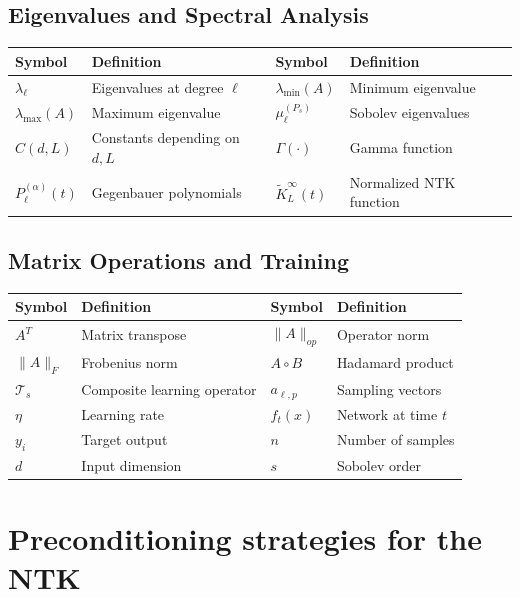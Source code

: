 \documentclass[a4paper]{article}
\theoremstyle{plain}
\theoremstyle{definition}
\theoremstyle{remark}
\begin{document}
\begin{tcolorbox}[colback=blue!5,colframe=blue!50!black,title={\large \textbf{Mathematical Notation Reference (continued)}},enhanced,drop shadow]
\subsection*{Eigenvalues and Spectral Analysis}
\begin{longtable}{p{}p{}p{}p{}}
\toprule
\textbf{Symbol} & \textbf{Definition} & \textbf{Symbol} & \textbf{Definition} \\
\midrule
$\lambda_\ell$ & Eigenvalues at degree $\ell$ & $\lambda_{\min}(A)$ & Minimum eigenvalue \\
$\lambda_{\max}(A)$ & Maximum eigenvalue & $\mu_\ell^{(P_s)}$ & Sobolev eigenvalues \\
$C(d,L)$ & Constants depending on $d,L$ & $\Gamma(\cdot)$ & Gamma function \\
$P_\ell^{(\alpha)}(t)$ & Gegenbauer polynomials & $\tilde{K}_L^{\infty}(t)$ & Normalized NTK function \\
\bottomrule
\end{longtable}

\subsection*{Matrix Operations and Training}
\begin{longtable}{p{}p{}p{}p{}}
\toprule
\textbf{Symbol} & \textbf{Definition} & \textbf{Symbol} & \textbf{Definition} \\
\midrule
$A^T$ & Matrix transpose & $\|A\|_{op}$ & Operator norm \\
$\|A\|_F$ & Frobenius norm & $A \circ B$ & Hadamard product \\
$\mathcal{T}_s$ & Composite learning operator & $a_{\ell,p}$ & Sampling vectors \\
$\eta$ & Learning rate & $f_t(x)$ & Network at time $t$ \\
$y_i$ & Target output & $n$ & Number of samples \\
$d$ & Input dimension & $s$ & Sobolev order \\
\bottomrule
\end{longtable}

\end{tcolorbox}

\newpage


\section{Preconditioning strategies for the NTK}
\end{document}
